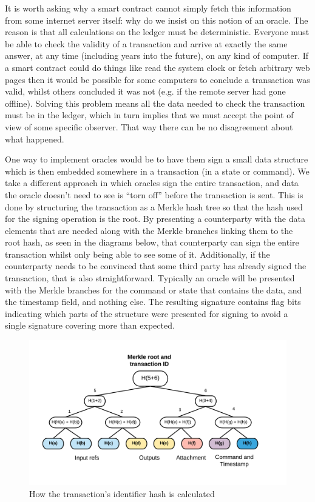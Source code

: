 \documentclass{article}
\begin{document}
It is worth asking why a smart contract cannot simply fetch this information from some internet server itself: why
do we insist on this notion of an oracle. The reason is that all calculations on the ledger must be deterministic.
Everyone must be able to check the validity of a transaction and arrive at exactly the same answer, at any time (including years into the future),
on any kind of computer. If a smart contract could do things like read the system clock or fetch arbitrary web pages
then it would be possible for some computers to conclude a transaction was valid, whilst others concluded it was
not (e.g. if the remote server had gone offline). Solving this problem means all the data needed to check the
transaction must be in the ledger, which in turn implies that we must accept the point of view of some specific
observer. That way there can be no disagreement about what happened.

One way to implement oracles would be to have them sign a small data structure which is then embedded somewhere
in a transaction (in a state or command). We take a different approach in which oracles sign the entire transaction,
and data the oracle doesn't need to see is ``torn off'' before the transaction is sent. This is done by structuring
the transaction as a Merkle hash tree so that the hash used for the signing operation is the root. By presenting a
counterparty with the data elements that are needed along with the Merkle branches linking them to the root hash,
as seen in the diagrams below,  that counterparty can sign the entire transaction whilst only being able to see some of it. Additionally, if the
counterparty needs to be convinced that some third party has already signed the transaction, that is also
straightforward. Typically an oracle will be presented with the Merkle branches for the command or state that
contains the data, and the timestamp field, and nothing else. The resulting signature contains flag bits indicating which
parts of the structure were presented for signing to avoid a single signature covering more than expected.

\begin{figure}[H]
\includegraphics[width=\textwidth]{tearoffs1}
\caption{How the transaction's identifier hash is calculated}
\end{figure}
\end{document}
